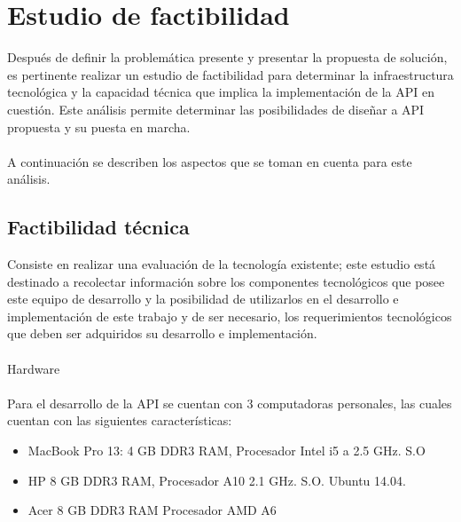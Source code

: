 	\section{Estudio de factibilidad}
Después de definir la problemática presente y presentar la propuesta de solución, es  pertinente realizar un estudio de factibilidad para determinar la infraestructura tecnológica y la capacidad técnica que implica la implementación de la API en cuestión. Este análisis permite determinar las posibilidades de diseñar a API propuesta y su puesta en marcha. 
\\\\
A continuación se describen los aspectos que se toman en cuenta para este análisis.
\subsection{Factibilidad técnica }
Consiste en realizar una evaluación de la tecnología existente; este estudio está destinado a recolectar información sobre los componentes tecnológicos que posee este equipo de desarrollo y la posibilidad de utilizarlos en el desarrollo e implementación de este trabajo y de ser necesario, los requerimientos tecnológicos que deben ser adquiridos su desarrollo e implementación. 
\\\\
Hardware 
\\\\
Para el desarrollo de la API se cuentan con 3 computadoras personales, las cuales cuentan 
con las siguientes características:
\begin{itemize}
 \item MacBook Pro 13: 4 GB DDR3 RAM, Procesador Intel i5 a 2.5 GHz. S.O
 \item HP  8 GB DDR3 RAM, Procesador A10 2.1 GHz. S.O. Ubuntu 14.04.
 \item Acer 8 GB DDR3 RAM Procesador AMD A6 
\end{itemize}



